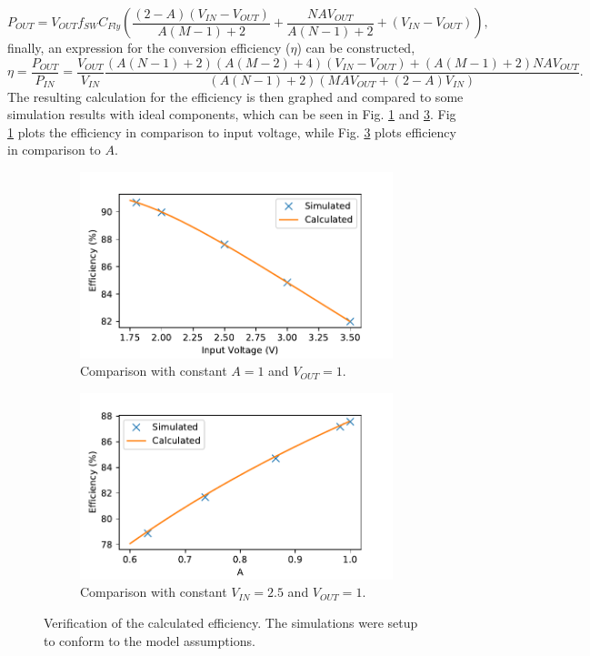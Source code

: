 \documentclass[conference]{article}
\begin{document}
 	\begin{equation}
 	P_{OUT} = V_{OUT}f_{SW}C_{Fly}\left(\frac{(2-A)(V_{IN} - V_{OUT})}{A(M-1) + 2} + \frac{NAV_{OUT}}{A(N-1) + 2} + (V_{IN} - V_{OUT})\right),
 	\label{eq:P_OUT}
 	\end{equation}
 	finally, an expression for the conversion efficiency ($\eta$) can be constructed,
 	\begin{equation}
 	\eta = \frac{P_{OUT}}{P_{IN}} = \frac{V_{OUT}}{V_{IN}}\frac{(A(N-1) + 2){(A(M-2) + 4)(V_{IN} - V_{OUT})} + (A(M-1) + 2)NAV_{OUT}}{(A(N-1) + 2)(MAV_{OUT} + (2-A)V_{IN})}.
 	\end{equation}
 	The resulting calculation for the efficiency is then graphed and compared to some simulation results with ideal components, which can be seen in Fig. \ref{fig:Comp_VIn} and \ref{fig:Comp_A}. Fig \ref{fig:Comp_VIn} plots the efficiency in comparison to input voltage, while Fig. \ref{fig:Comp_A} plots efficiency in comparison to $A$.
 	
 	\begin{figure}
 		\begin{subfigure}{0.5\textwidth}
 			\includegraphics[width=\linewidth]{Figures/eta_VIn.pdf}
 			\caption{Comparison with constant $A = 1$ and $V_{OUT} = 1$.}
 			\label{fig:Comp_VIn}
 		\end{subfigure}
 	\begin{subfigure}{0.49\textwidth}
 		\includegraphics[width=\linewidth]{Figures/eta_A.pdf}
 		\caption{Comparison with constant $V_{IN} = 2.5$ and $V_{OUT} = 1$.}
 		\label{fig:Comp_A}
 	\end{subfigure}
 		\caption{Verification of the calculated efficiency. The simulations were setup to conform to the model assumptions.}
 	\end{figure}
 
\end{document}
